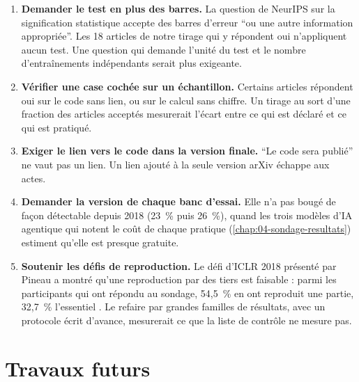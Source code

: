 \begin{enumerate}
  \item \textbf{Demander le test en plus des barres.} La question de NeurIPS sur la
        signification statistique accepte des barres d'erreur \enquote{ou une autre information
        appropriée}. Les 18 articles de notre tirage qui y répondent oui n'appliquent aucun test. Une question qui
        demande l'unité du test et le nombre d'entraînements indépendants serait plus exigeante.
  \item \textbf{Vérifier une case cochée sur un échantillon.} Certains articles répondent oui sur le code
        sans lien, ou sur le calcul sans chiffre. Un tirage au sort d'une fraction des articles acceptés
        mesurerait l'écart entre ce qui est déclaré et ce qui est pratiqué.
  \item \textbf{Exiger le lien vers le code dans la version finale.} \enquote{Le code sera publié}
        ne vaut pas un lien. Un lien ajouté à la seule version arXiv échappe aux actes.
  \item \textbf{Demander la version de chaque banc d'essai.} Elle n'a pas bougé de façon détectable depuis
        2018 (23~\% puis 26~\%), quand les trois modèles d'IA agentique qui notent le coût de chaque
        pratique (\cref{chap:04-sondage-resultats}) estiment qu'elle est presque gratuite.
  \item \textbf{Soutenir les défis de reproduction.} Le défi d'ICLR 2018 présenté par Pineau a montré
        qu'une reproduction par des tiers est faisable : parmi les participants qui ont répondu au
        sondage, 54,5~\% en ont reproduit une partie, 32,7~\% l'essentiel
        \parencite[diapositives 37 à 43]{pineau2018iclr}. Le refaire par grandes familles de
        résultats, avec un protocole écrit d'avance, mesurerait ce que la liste de contrôle ne
        mesure pas.
\end{enumerate}

\section{Travaux futurs}
\label{sec:futurs}

